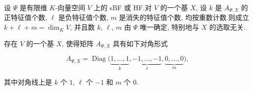 \begin{corollary}\label{cor:7.6.9}
设 $\Psi$ 是有限维 $K$-向量空间 $V$ 上的 sBF 或 HF.对 $V$ 的一个基 $X$, 设 $k$ 是 $A_{\varPsi, X}$ 的正特征值个数, $\ell$ 是负特征值个数, $m$ 是消失的特征值个数, 均按重数计数.则成立 $k + \ell + m = \dim_K V$, 并且数 $k$, $\ell$, $m$ 由 $\Psi$ 唯一确定, 特别地与 $X$ 的选取无关.

存在 $V$ 的一个基 $X$, 使得矩阵 $A_{\varPsi, X}$ 具有如下对角形式

\[
A_{\varPsi, X} = \operatorname{Diag}\bigl(\underbrace{1, \ldots, 1}_{k}, \underbrace{-1, \ldots, -1}_{\ell}, \underbrace{0, \ldots, 0}_{m}\bigr),
\]

其中对角线上是 $k$ 个 $1$, $\ell$ 个 $-1$ 和 $m$ 个 $0$.
\end{corollary}

